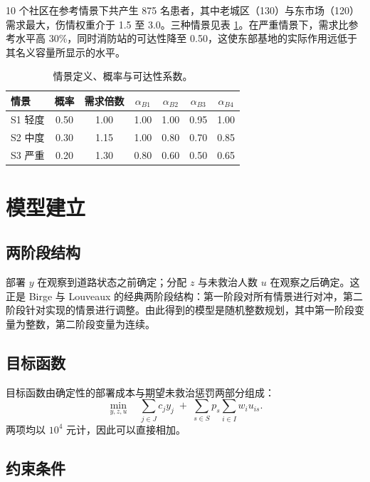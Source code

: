\documentclass[12pt,a4paper,fontset=windows]{ctexart}
\begin{document}
10 个社区在参考情景下共产生 875 名患者，其中老城区（130）与东市场（120）需求最大，伤情权重介于 1.5 至 3.0。三种情景见表 \ref{tab:scenario}。在严重情景下，需求比参考水平高 30\%，同时消防站的可达性降至 0.50，这使东部基地的实际作用远低于其名义容量所显示的水平。

\begin{table}[!ht]
\centering
\caption{情景定义、概率与可达性系数。}
\label{tab:scenario}
\small
\begin{tabular}{lcccccc}
\toprule
情景 & 概率 & 需求倍数 & $\alpha_{B1}$ & $\alpha_{B2}$ & $\alpha_{B3}$ & $\alpha_{B4}$ \\
\midrule
S1 轻度 & 0.50 & 1.00 & 1.00 & 1.00 & 0.95 & 1.00 \\
S2 中度 & 0.30 & 1.15 & 1.00 & 0.80 & 0.70 & 0.85 \\
S3 严重 & 0.20 & 1.30 & 0.80 & 0.60 & 0.50 & 0.65 \\
\bottomrule
\end{tabular}
\end{table}

\section{模型建立}

\subsection{两阶段结构}

部署 $y$ 在观察到道路状态之前确定；分配 $z$ 与未救治人数 $u$ 在观察之后确定。这正是 Birge 与 Louveaux \cite{birge2011} 的经典两阶段结构：第一阶段对所有情景进行对冲，第二阶段针对实现的情景进行调整。由此得到的模型是随机整数规划，其中第一阶段变量为整数，第二阶段变量为连续。

\subsection{目标函数}

目标函数由确定性的部署成本与期望未救治惩罚两部分组成：
\begin{equation}
\min_{y,z,u}\quad \sum_{j\in J} c_j y_j \;+\; \sum_{s\in S} p_s \sum_{i\in I} w_i u_{is}.
\label{eq:obj}
\end{equation}
两项均以 $10^{4}$ 元计，因此可以直接相加。

\subsection{约束条件}
\end{document}
